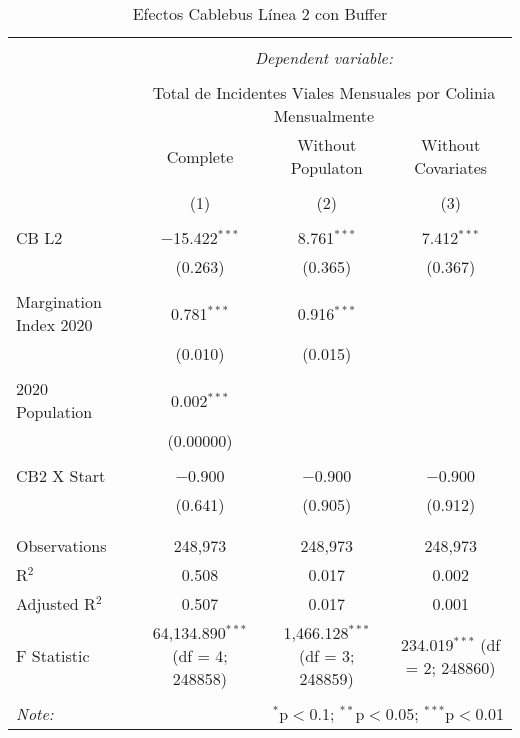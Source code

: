 
\begin{table}[!htbp] \centering 
  \caption{Efectos Cablebus Línea 2 con Buffer} 
  \label{} 
\begin{tabular}{@{\extracolsep{5pt}}lccc} 
\\[-1.8ex]\hline 
\hline \\[-1.8ex] 
 & \multicolumn{3}{c}{\textit{Dependent variable:}} \\ 
\cline{2-4} 
\\[-1.8ex] & \multicolumn{3}{c}{Total de Incidentes Viales Mensuales por Colinia Mensualmente} \\ 
 & Complete & Without Populaton & Without Covariates \\ 
\\[-1.8ex] & (1) & (2) & (3)\\ 
\hline \\[-1.8ex] 
 CB L2 & $-$15.422$^{***}$ & 8.761$^{***}$ & 7.412$^{***}$ \\ 
  & (0.263) & (0.365) & (0.367) \\ 
  & & & \\ 
 Margination Index 2020 & 0.781$^{***}$ & 0.916$^{***}$ &  \\ 
  & (0.010) & (0.015) &  \\ 
  & & & \\ 
 2020 Population & 0.002$^{***}$ &  &  \\ 
  & (0.00000) &  &  \\ 
  & & & \\ 
 CB2 X Start & $-$0.900 & $-$0.900 & $-$0.900 \\ 
  & (0.641) & (0.905) & (0.912) \\ 
  & & & \\ 
\hline \\[-1.8ex] 
Observations & 248,973 & 248,973 & 248,973 \\ 
R$^{2}$ & 0.508 & 0.017 & 0.002 \\ 
Adjusted R$^{2}$ & 0.507 & 0.017 & 0.001 \\ 
F Statistic & 64,134.890$^{***}$ (df = 4; 248858) & 1,466.128$^{***}$ (df = 3; 248859) & 234.019$^{***}$ (df = 2; 248860) \\ 
\hline 
\hline \\[-1.8ex] 
\textit{Note:}  & \multicolumn{3}{r}{$^{*}$p$<$0.1; $^{**}$p$<$0.05; $^{***}$p$<$0.01} \\ 
\end{tabular} 
\end{table} 
